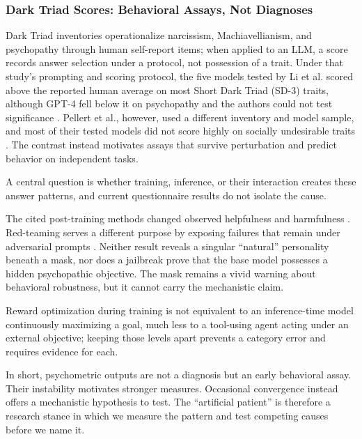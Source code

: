 \documentclass{article}
\begin{document}
\subsubsection{Dark Triad Scores: Behavioral Assays, Not Diagnoses}
Dark Triad inventories operationalize narcissism, Machiavellianism, and psychopathy through human self-report items; when applied to an LLM, a score records answer selection under a protocol, not possession of a trait. Under that study's prompting and scoring protocol, the five models tested by Li et al. scored above the reported human average on most Short Dark Triad (SD-3) traits, although GPT-4 fell below it on psychopathy and the authors could not test significance \citep{ref62}. Pellert et al., however, used a different inventory and model sample, and most of their tested models did not score highly on socially undesirable traits \citep{ref63}. The contrast instead motivates assays that survive perturbation and predict behavior on independent tasks.

A central question is whether training, inference, or their interaction creates these answer patterns, and current questionnaire results do not isolate the cause.

The cited post-training methods changed observed helpfulness and harmfulness \citep{ref25, ref27}. Red-teaming serves a different purpose by exposing failures that remain under adversarial prompts \citep{ref26}. Neither result reveals a singular ``natural'' personality beneath a mask, nor does a jailbreak prove that the base model possesses a hidden psychopathic objective. The mask remains a vivid warning about behavioral robustness, but it cannot carry the mechanistic claim.

Reward optimization during training is not equivalent to an inference-time model continuously maximizing a goal, much less to a tool-using agent acting under an external objective; keeping those levels apart prevents a category error and requires evidence for each.

In short, psychometric outputs are not a diagnosis but an early behavioral assay. Their instability motivates stronger measures. Occasional convergence instead offers a mechanistic hypothesis to test. The ``artificial patient'' is therefore a research stance in which we measure the pattern and test competing causes before we name it.
\end{document}
